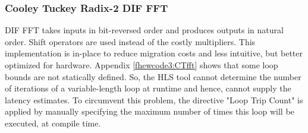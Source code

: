 \subsubsection{Cooley Tuckey Radix-2 DIF FFT}
DIF FFT takes inputs in bit-reversed order and produces outputs in natural order. Shift operators are used instead of the costly multipliers. This implementation is in-place to reduce migration costs and less intuitive, but better optimized for hardware. \newline\newline
Appendix \ref{fhewcode3:CTfft} shows that some loop bounds are not statically defined. So, the HLS tool cannot determine the number of iterations of a variable-length loop at runtime and hence, cannot supply the latency estimates. To circumvent this problem, the directive "Loop Trip Count" is applied by manually specifying the maximum number of times this loop will be executed, at compile time.\newline\newline

